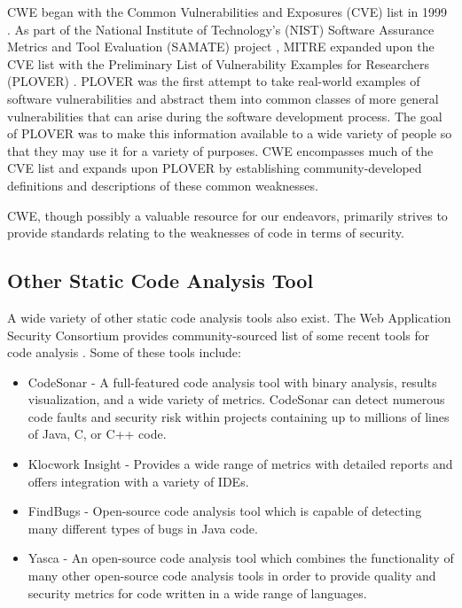 \documentclass{sig-alternate}
\begin{document}
CWE began with the Common Vulnerabilities and Exposures (CVE) list in 1999 \cite{mitre2005cve}. As part of the National Institute of Technology's (NIST) Software Assurance Metrics and Tool Evaluation (SAMATE) project \cite{nist2005samate}, MITRE expanded upon the CVE list with the Preliminary List of Vulnerability Examples for Researchers (PLOVER) \cite{christey2005plover}. PLOVER was the first attempt to take real-world examples of software vulnerabilities and abstract them into common classes of more general vulnerabilities that can arise during the software development process. The goal of PLOVER was to make this information available to a wide variety of people so that they may use it for a variety of purposes. CWE encompasses much of the CVE list and expands upon PLOVER by establishing community-developed definitions and descriptions of these common weaknesses.

CWE, though possibly a valuable resource for our endeavors, primarily strives to provide standards relating to the weaknesses of code in terms of security.

\subsection{Other Static Code Analysis Tool}
A wide variety of other static code analysis tools also exist. The Web Application Security Consortium provides community-sourced list of some recent tools for code analysis \cite{webappsec2012}. Some of these tools include:

\begin{itemize}
\item CodeSonar - A full-featured code analysis tool with binary analysis, results visualization, and a wide variety of metrics. CodeSonar can detect numerous code faults and security risk within projects containing up to millions of lines of Java, C, or C++ code.
\item Klocwork Insight - Provides a wide range of metrics with detailed reports and offers integration with a variety of IDEs.
\item FindBugs - Open-source code analysis tool which is capable of detecting many different types of bugs in Java code.
\item Yasca - An open-source code analysis tool which combines the functionality of many other open-source code analysis tools in order to provide quality and security metrics for code written in a wide range of languages.
\end{itemize}
\end{document}
